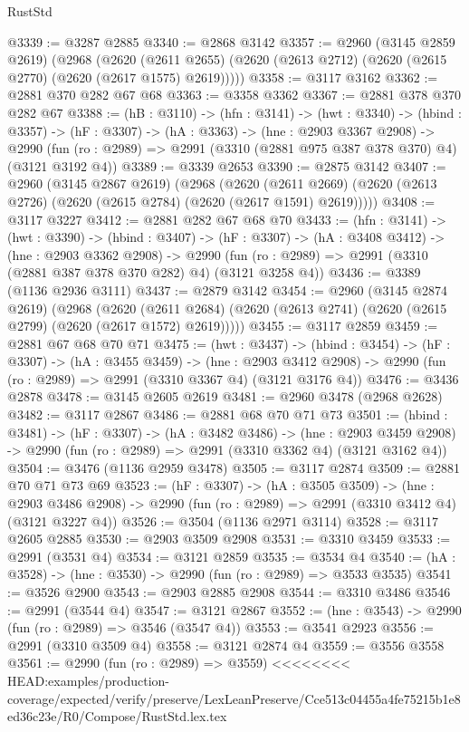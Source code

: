 \begin{lexlean}{RustStd}
\begin{coremodule}
{\begin{coremodule}
{{{{{{{@3339 := @3287 @2885
@3340 := @2868 @3142
@3357 := @2960
    (@3145 @2859 @2619)
    (@2968
      (@2620 (@2611 @2655) (@2620 (@2613 @2712) (@2620 (@2615 @2770) (@2620 (@2617 @1575) @2619)))))
@3358 := @3117 @3162
@3362 := @2881 @370 @282 @67 @68
@3363 := @3358 @3362
@3367 := @2881 @378 @370 @282 @67
@3388 := (hB : @3110) ->
  (hfn : @3141) ->
  (hwt : @3340) ->
  (hbind : @3357) ->
  (hF : @3307) ->
  (hA : @3363) ->
  (hne : @2903 @3367 @2908) ->
  @2990 (fun (ro : @2989) => @2991 (@3310 (@2881 @975 @387 @378 @370) @4) (@3121 @3192 @4))
@3389 := @3339 @2653
@3390 := @2875 @3142
@3407 := @2960
    (@3145 @2867 @2619)
    (@2968
      (@2620 (@2611 @2669) (@2620 (@2613 @2726) (@2620 (@2615 @2784) (@2620 (@2617 @1591) @2619)))))
@3408 := @3117 @3227
@3412 := @2881 @282 @67 @68 @70
@3433 := (hfn : @3141) ->
  (hwt : @3390) ->
  (hbind : @3407) ->
  (hF : @3307) ->
  (hA : @3408 @3412) ->
  (hne : @2903 @3362 @2908) ->
  @2990 (fun (ro : @2989) => @2991 (@3310 (@2881 @387 @378 @370 @282) @4) (@3121 @3258 @4))
@3436 := @3389 (@1136 @2936 @3111)
@3437 := @2879 @3142
@3454 := @2960
    (@3145 @2874 @2619)
    (@2968
      (@2620 (@2611 @2684) (@2620 (@2613 @2741) (@2620 (@2615 @2799) (@2620 (@2617 @1572) @2619)))))
@3455 := @3117 @2859
@3459 := @2881 @67 @68 @70 @71
@3475 := (hwt : @3437) ->
  (hbind : @3454) ->
  (hF : @3307) ->
  (hA : @3455 @3459) ->
  (hne : @2903 @3412 @2908) -> @2990 (fun (ro : @2989) => @2991 (@3310 @3367 @4) (@3121 @3176 @4))
@3476 := @3436 @2878
@3478 := @3145 @2605 @2619
@3481 := @2960 @3478 (@2968 @2628)
@3482 := @3117 @2867
@3486 := @2881 @68 @70 @71 @73
@3501 := (hbind : @3481) ->
  (hF : @3307) ->
  (hA : @3482 @3486) ->
  (hne : @2903 @3459 @2908) -> @2990 (fun (ro : @2989) => @2991 (@3310 @3362 @4) (@3121 @3162 @4))
@3504 := @3476 (@1136 @2959 @3478)
@3505 := @3117 @2874
@3509 := @2881 @70 @71 @73 @69
@3523 := (hF : @3307) ->
  (hA : @3505 @3509) ->
  (hne : @2903 @3486 @2908) -> @2990 (fun (ro : @2989) => @2991 (@3310 @3412 @4) (@3121 @3227 @4))
@3526 := @3504 (@1136 @2971 @3114)
@3528 := @3117 @2605 @2885
@3530 := @2903 @3509 @2908
@3531 := @3310 @3459
@3533 := @2991 (@3531 @4)
@3534 := @3121 @2859
@3535 := @3534 @4
@3540 := (hA : @3528) -> (hne : @3530) -> @2990 (fun (ro : @2989) => @3533 @3535)
@3541 := @3526 @2900
@3543 := @2903 @2885 @2908
@3544 := @3310 @3486
@3546 := @2991 (@3544 @4)
@3547 := @3121 @2867
@3552 := (hne : @3543) -> @2990 (fun (ro : @2989) => @3546 (@3547 @4))
@3553 := @3541 @2923
@3556 := @2991 (@3310 @3509 @4)
@3558 := @3121 @2874 @4
@3559 := @3556 @3558
@3561 := @2990 (fun (ro : @2989) => @3559)
<<<<<<<< HEAD:examples/production-coverage/expected/verify/preserve/LexLeanPreserve/Cce513c04455a4fe75215b1e8ed36c23e/R0/Compose/RustStd.lex.tex
}}}}}}}
\end{coremodule}}
\end{coremodule}
\end{lexlean}
